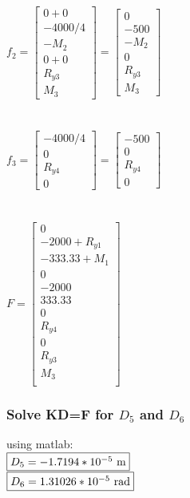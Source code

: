 \documentclass{article}
\begin{document}
$f_2=\begin{bmatrix}
    0 + 0 \\ -4000/4 \\ -M_2 \\
    0 + 0 \\ R_{y3} \\ M_3
\end{bmatrix}=\begin{bmatrix}
    0 \\ -500 \\ -M_2 \\
    0 \\ R_{y3} \\ M_3
\end{bmatrix}$ \\\\\\
$f_3=\begin{bmatrix}
    -4000/4 \\ 0 \\ R_{y4} \\ 0
\end{bmatrix}=\begin{bmatrix}
    -500 \\ 0 \\ R_{y4} \\ 0
\end{bmatrix}$ \\\\\\
$F=\begin{bmatrix}
    0 \\ -2000+R_{y1} \\ -333.33+M_1 \\
    0 \\ -2000 \\ 333.33 \\
    0 \\ R_{y4} \\ 0 \\
    R_{y3} \\ M_3 \\
\end{bmatrix}$

\subsubsection*{Solve KD=F for $D_5$ and $D_6$}
using matlab: \\
$\fbox{$D_5=-1.7194*10^{-5}$ m}$ \\
$\fbox{$D_6=1.31026*10^{-5}$ rad}$
\end{document}
